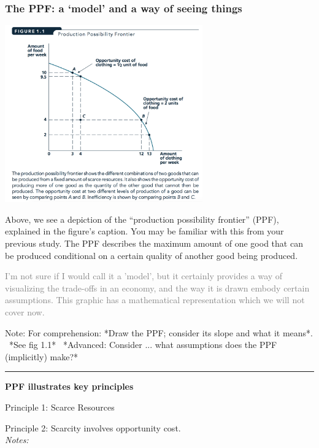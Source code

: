 \documentclass[]{article}
\begin{document}
\hypertarget{the-ppf-a-model-and-a-way-of-seeing-things}{%
\subsubsection{The PPF: a `model' and a way of seeing things}\label{the-ppf-a-model-and-a-way-of-seeing-things}}

\includegraphics[height=3in]{picsfigs/PPF_text.png}

Above, we see a depiction of the ``production possibility frontier'' (PPF), explained in the figure's caption. You may be familiar with this from your previous study. The PPF describes the maximum amount of one good that can be produced conditional on a certain quality of another good being produced.

\textcolor{gray}{I'm not sure if I would call it a 'model', but it certainly provides a way of visualizing the trade-offs in an economy, and the way it is drawn embody certain assumptions. This graphic has a mathematical representation which we will not cover now.}

Note: \textcolor{RawSienna}{For comprehension: *Draw the PPF; consider its slope and what it means*. \ *See fig 1.1*  \ *Advanced: Consider ... what assumptions does the PPF (implicitly) make?*}

\begin{center}\rule{0.5\linewidth}{\linethickness}\end{center}

\textbf{PPF illustrates key principles}

Principle 1: Scarce Resources

Principle 2: Scarcity involves opportunity cost.\\

\emph{Notes:}
\end{document}
